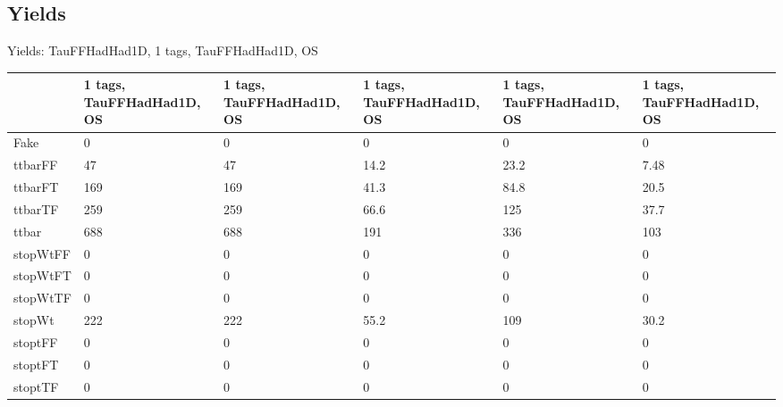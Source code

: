 
\subsection{Yields}

\begin{frame}{Yields: TauFFHadHad1D, 1 tags, TauFFHadHad1D, OS}
\begin{center}
  \begin{tabular}{l| >{\centering\let\newline\\\arraybackslash\hspace{0pt}}m{1.4cm}| >{\centering\let\newline\\\arraybackslash\hspace{0pt}}m{1.4cm}| >{\centering\let\newline\\\arraybackslash\hspace{0pt}}m{1.4cm}| >{\centering\let\newline\\\arraybackslash\hspace{0pt}}m{1.4cm}| >{\centering\let\newline\\\arraybackslash\hspace{0pt}}m{1.4cm}}
    & 1 tags, TauFFHadHad1D, OS & 1 tags, TauFFHadHad1D, OS & 1 tags, TauFFHadHad1D, OS & 1 tags, TauFFHadHad1D, OS & 1 tags, TauFFHadHad1D, OS \\
 \hline \hline
    Fake& 0 & 0 & 0 & 0 & 0 \\
 \hline
    ttbarFF& 47 & 47 & 14.2 & 23.2 & 7.48 \\
 \hline
    ttbarFT& 169 & 169 & 41.3 & 84.8 & 20.5 \\
 \hline
    ttbarTF& 259 & 259 & 66.6 & 125 & 37.7 \\
 \hline
    ttbar& 688 & 688 & 191 & 336 & 103 \\
 \hline
    stopWtFF& 0 & 0 & 0 & 0 & 0 \\
 \hline
    stopWtFT& 0 & 0 & 0 & 0 & 0 \\
 \hline
    stopWtTF& 0 & 0 & 0 & 0 & 0 \\
 \hline
    stopWt& 222 & 222 & 55.2 & 109 & 30.2 \\
 \hline
    stoptFF& 0 & 0 & 0 & 0 & 0 \\
 \hline
    stoptFT& 0 & 0 & 0 & 0 & 0 \\
 \hline
    stoptTF& 0 & 0 & 0 & 0 & 0 \\
 \hline

\end{tabular}
\end{center}
\end{frame}
